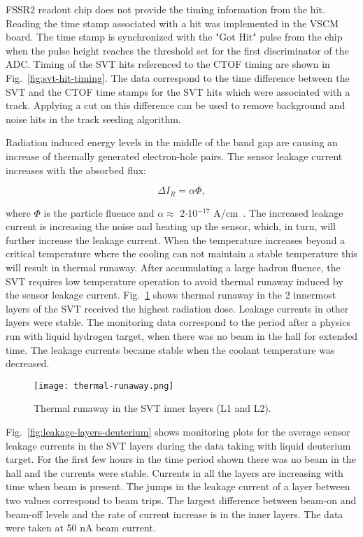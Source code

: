 FSSR2 readout chip does not provide the timing information from the hit. Reading the time stamp associated with a hit was implemented in the VSCM board. The time stamp is synchronized with the "Got Hit" pulse from the chip when the pulse height reaches the threshold set for the first discriminator of the ADC. Timing of the SVT hits referenced to the CTOF timing are shown in Fig.~\ref{fig:svt-hit-timing}. The data correspond to the time difference between the SVT and the CTOF time stamps for the SVT hits which were associated with a track. Applying a cut on this difference can be  used to remove background and noise hits in the track seeding algorithm.

Radiation induced energy levels in the middle of the band gap are causing an increase of thermally generated electron-hole pairs. The sensor leakage current increases with the absorbed flux:

\begin{equation} \Delta I_R = \alpha \Phi \label{eq:leakage-fluence},
\end{equation}

where $\Phi$ is the particle fluence and $\alpha \approx$ 2$\cdot$10$^{-17}$ A/cm~\cite{BLOCHTHESIS}. The increased leakage current is increasing the noise and heating up the sensor, which, in turn, will further increase the leakage current. When the temperature increases beyond a critical temperature where the cooling can not maintain a stable temperature this will result in thermal runaway. After accumulating a large hadron fluence, the SVT requires low temperature operation to avoid thermal runaway induced by the sensor leakage current. Fig.~\ref{fig:thermal-runaway} shows thermal runaway in the 2 innermost layers of the SVT received the highest radiation dose. Leakage currents in other layers were stable. The monitoring data correspond to the period after a physics run with liquid hydrogen target, when there was no beam in the hall for extended time. The leakage currents became stable when the coolant temperature was decreased.

\begin{figure}[hbt] 
\centering 
\texttt{[image: thermal-runaway.png]}
\caption{Thermal runaway in the SVT inner layers (L1 and L2).}
\label{fig:thermal-runaway}
\end{figure}

Fig.~\ref{fig:leakage-layers-deuterium} shows monitoring plots for the average sensor leakage currents in the SVT layers during the data taking with liquid deuterium target. For the first few hours in the time period shown there was no beam in the hall and the currents were stable. Currents in all the layers are increasing with time when beam is present. The jumps in the leakage current of a layer between two values correspond to beam trips. The largest difference between beam-on and beam-off levels and the rate of current increase is in the inner layers. The data were taken at 50 nA beam current. 

